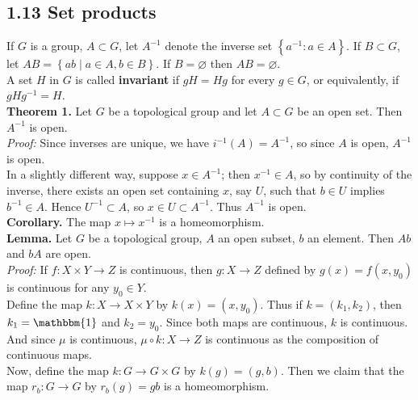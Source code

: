 \documentclass[a4paper]{article}
\theoremstyle{plain}%
\theoremstyle{definition}
\theoremstyle{remark}
\begin{document}
\subsection*{1.13 \quad Set products}
If $G$ is a group, $A \subset G$, let $A^{-1}$ denote the inverse set
$\left\{ a^{-1} \colon a \in A \right\} $. If
$B \subset G$, let $AB = \left\{ ab  \mid a \in A, b \in B \right\} $. If
$B = \varnothing$ then $AB = \varnothing$.\\
A set $H$ in $G$ is called \textbf{invariant} if $gH = Hg$ for every $g \in G$,
or equivalently, if $gHg^{-1} = H$.\\
\linebreak
\textbf{Theorem 1.} Let $G$ be a topological group and let
$A \subset G$ be an open set. Then $A^{-1}$ is open.\\
\linebreak
\textit{Proof:} Since inverses are unique, we have
$i^{-1}\left( A \right) = A^{-1}$, so since $A$ is open, $A^{-1}$ is open.\\
\linebreak
In a slightly different way, suppose $x \in A^{-1}$; then $x^{-1} \in A$, so
by continuity of the inverse, there exists an open set containing $x$, say $U$,
such that $b \in U$ implies $b^{-1} \in A$. Hence
$U^{-1} \subset A$, so $x \in U \subset A^{-1}$. Thus
$A^{-1}$ is open.\\
\linebreak
\textbf{Corollary.} The map $x \mapsto x^{-1}$ is a homeomorphism.\\
\linebreak
\textbf{Lemma.} Let $G$ be a topological group, $A$ an open subset,
$b$ an element. Then $Ab$ and $bA$ are open.\\
\linebreak
\textit{Proof:} 
If $f  \colon X \times Y \to Z$ is continuous, then
$g  \colon X \to Z$ defined by $g(x) = f(x,y_0)$ is continuous for any $y_0 \in
Y$.\\
Define the map $k  \colon X \to X \times Y$ by
$k(x) = \left( x,y_0 \right) $. Thus
if $k = (k_1, k_2)$, then $k_1 = \mathbbm{1}$ and
$k_2 = y_0$. Since both maps are continuous, $k$ is continuous. And since
$\mu$ is continuous, $\mu \circ k  \colon X \to Z$ is continuous as the
composition of continuous maps.\\
\linebreak
Now, define the map $k  \colon G \to G \times G$ by
$k(g) = (g,b)$. Then
we claim that the map $r_b  \colon G \to G$ by
$r_b (g) = gb$ is a homeomorphism.\\
\end{document}

